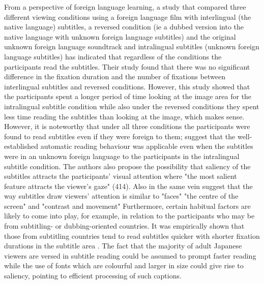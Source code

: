 \documentclass[output=paper]{langsci/langscibook}
\begin{document}
From a perspective of foreign language learning, a study \citep{bisson2014} that compared three different viewing conditions using a foreign language film with interlingual (the native language) subtitles, a reversed condition (ie a dubbed version into the native language with unknown foreign language subtitles) and the original unknown foreign language soundtrack and intralingual subtitles (unknown foreign language subtitles) has indicated that regardless of the conditions the participants read the subtitles. Their study found that there was no significant difference in the fixation duration and the number of fixations between interlingual subtitles and reversed conditions. However, this study showed that the participants spent a longer period of time looking at the image area for the intralingual subtitle condition while also under the reversed conditions they spent less time reading the subtitles than looking at the image, which makes sense. However, it is noteworthy that under all three conditions the participants were found to read subtitles even if they were foreign to them; \citet[p. 414]{bisson2014} suggest that the well-established automatic reading behaviour was applicable even when the subtitles were in an unknown foreign language to the participants in the intralingual subtitle condition. The authors also propose the possibility that saliency of the subtitles attracts the participants' visual attention where "the most salient feature attracts the viewer's gaze" (414).  Also in the same vein \citet[n.p.]{Kruger2015} suggest that the way subtitles draw viewers' attention is similar to "faces" "the centre of the screen" and "contrast and movement"  Furthermore, certain habitual factors are likely to come into play, for example, in relation to the participants who may be from subtitling- or dubbing-oriented countries. It was empirically shown that those from subtitling countries tend to read subtitles quicker with shorter fixation durations in the subtitle area \citep{Bruycker2007}.  The fact that the majority of adult Japanese viewers are versed in subtitle reading could be assumed to prompt faster reading while the use of fonts which are colourful and larger in size could give rise to saliency, pointing to efficient processing of such captions.   
\end{document}
